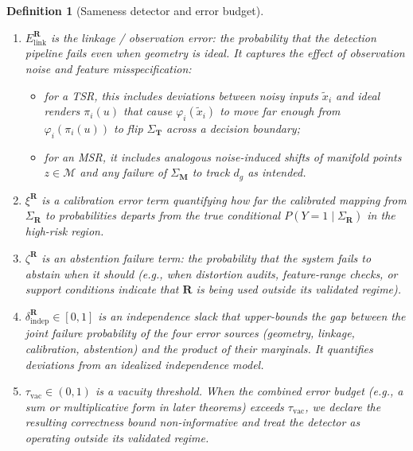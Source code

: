 \documentclass[11pt]{article}
\newtheorem{definition}{Definition}
\begin{document}
\begin{definition}[Sameness detector and error budget]
\begin{enumerate}[label=\textnormal{(\roman*)}, leftmargin=*]
\item $E_{\mathrm{link}}^{\mathbf{R}}$ is the \emph{linkage / observation error}:
the probability that the detection pipeline fails \emph{even when geometry is ideal}.
It captures the effect of observation noise and feature misspecification:
\begin{itemize}
\item for a TSR, this includes deviations between noisy inputs $\tilde{x}_i$ and ideal
renders $\pi_i(u)$ that cause $\varphi_i(\tilde{x}_i)$ to move far enough from
$\varphi_i(\pi_i(u))$ to flip $\Sigma_{\mathbf{T}}$ across a decision boundary;
\item for an MSR, it includes analogous noise-induced shifts of manifold points
$z\in\mathcal{M}$ and any failure of $\Sigma_{\mathbf{M}}$ to track $d_g$ as intended.
\end{itemize}

\item $\xi^{\mathbf{R}}$ is a \emph{calibration error} term quantifying how far the
calibrated mapping from $\Sigma_{\mathbf{R}}$ to probabilities departs from the true
conditional $P(Y=1\mid \Sigma_{\mathbf{R}})$ in the high-risk region.

\item $\zeta^{\mathbf{R}}$ is an \emph{abstention failure} term: the probability that the
system fails to abstain when it should (e.g., when distortion audits, feature-range checks,
or support conditions indicate that $\mathbf{R}$ is being used outside its validated regime).

\item $\delta_{\mathrm{indep}}^{\mathbf{R}} \in [0,1]$ is an \emph{independence slack} that
upper-bounds the gap between the joint failure probability of the four error sources
(geometry, linkage, calibration, abstention) and the product of their marginals. It
quantifies deviations from an idealized independence model.

\item $\tau_{\mathrm{vac}}\in(0,1)$ is a \emph{vacuity threshold}. When the combined error
budget (e.g., a sum or multiplicative form in later theorems) exceeds $\tau_{\mathrm{vac}}$,
we declare the resulting correctness bound non-informative and treat the detector as
operating outside its validated regime.
\end{enumerate}
\end{definition}
\end{document}

